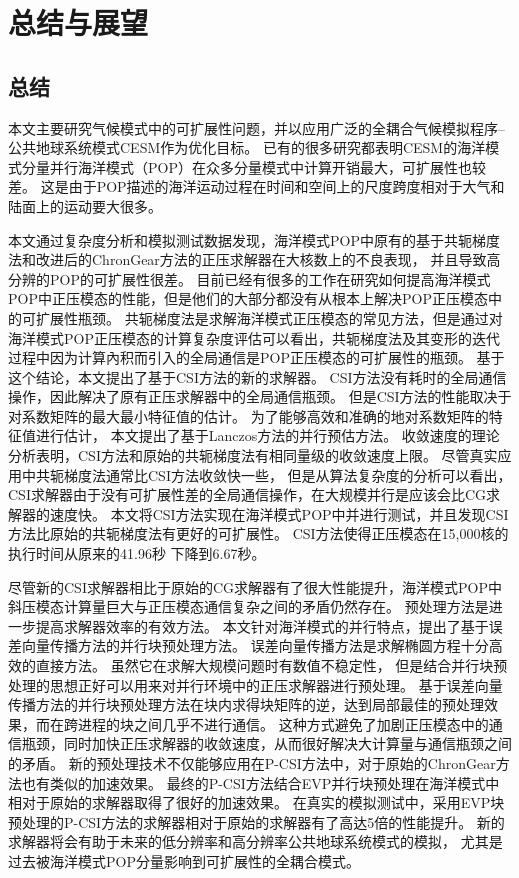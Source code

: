 \chapter{总结与展望}
\label{cha:conclusion}

\section{总结}
\label{sec:conclude}


本文主要研究气候模式中的可扩展性问题，并以应用广泛的全耦合气候模拟程序--公共地球系统模式CESM作为优化目标。
已有的很多研究都表明CESM的海洋模式分量并行海洋模式（POP）在众多分量模式中计算开销最大，可扩展性也较差。 
这是由于POP描述的海洋运动过程在时间和空间上的尺度跨度相对于大气和陆面上的运动要大很多。  


本文通过复杂度分析和模拟测试数据发现，海洋模式POP中原有的基于共轭梯度法和改进后的ChronGear方法的正压求解器在大核数上的不良表现，
并且导致高分辨的POP的可扩展性很差。
目前已经有很多的工作在研究如何提高海洋模式POP中正压模态的性能，但是他们的大部分都没有从根本上解决POP正压模态中的可扩展性瓶颈。 
共轭梯度法是求解海洋模式正压模态的常见方法，但是通过对海洋模式POP正压模态的计算复杂度评估可以看出，共轭梯度法及其变形的迭代过程中因为计算內积而引入的全局通信是POP正压模态的可扩展性的瓶颈。 
基于这个结论，本文提出了基于CSI方法的新的求解器。
CSI方法没有耗时的全局通信操作，因此解决了原有正压求解器中的全局通信瓶颈。 
但是CSI方法的性能取决于对系数矩阵的最大最小特征值的估计。
为了能够高效和准确的地对系数矩阵的特征值进行估计， 本文提出了基于Lanczos方法的并行预估方法。
收敛速度的理论分析表明，CSI方法和原始的共轭梯度法有相同量级的收敛速度上限。
尽管真实应用中共轭梯度法通常比CSI方法收敛快一些，
但是从算法复杂度的分析可以看出，CSI求解器由于没有可扩展性差的全局通信操作，在大规模并行是应该会比CG求解器的速度快。
本文将CSI方法实现在海洋模式POP中并进行测试，并且发现CSI方法比原始的共轭梯度法有更好的可扩展性。
CSI方法使得正压模态在15,000核的执行时间从原来的41.96秒 下降到6.67秒。    
 
尽管新的CSI求解器相比于原始的CG求解器有了很大性能提升，海洋模式POP中斜压模态计算量巨大与正压模态通信复杂之间的矛盾仍然存在。
预处理方法是进一步提高求解器效率的有效方法。
本文针对海洋模式的并行特点，提出了基于误差向量传播方法的并行块预处理方法。
误差向量传播方法是求解椭圆方程十分高效的直接方法。
虽然它在求解大规模问题时有数值不稳定性，
但是结合并行块预处理的思想正好可以用来对并行环境中的正压求解器进行预处理。
基于误差向量传播方法的并行块预处理方法在块内求得块矩阵的逆，达到局部最佳的预处理效果，而在跨进程的块之间几乎不进行通信。
这种方式避免了加剧正压模态中的通信瓶颈，同时加快正压求解器的收敛速度，从而很好解决大计算量与通信瓶颈之间的矛盾。
新的预处理技术不仅能够应用在P-CSI方法中，对于原始的ChronGear方法也有类似的加速效果。
最终的P-CSI方法结合EVP并行块预处理在海洋模式中相对于原始的求解器取得了很好的加速效果。
在真实的模拟测试中，采用EVP块预处理的P-CSI方法的求解器相对于原始的求解器有了高达5倍的性能提升。
新的求解器将会有助于未来的低分辨率和高分辨率公共地球系统模式的模拟， 尤其是过去被海洋模式POP分量影响到可扩展性的全耦合模式。 


